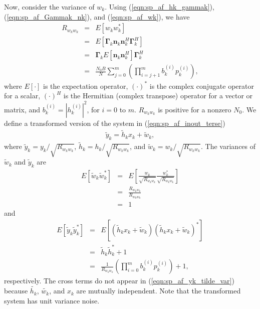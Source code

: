 Now, consider the variance of $w_k$.  Using (\ref{eqn:sp_af_hk_gammak}), (\ref{eqn:sp_af_Gammak_nk}), and (\ref{eqn:sp_af_wk}), we have
\begin{eqnarray}
R_{w_kw_k} & = & E \left[ w_k w_k^* \right] \\
& = & E \left[ \mathbf{\Gamma}_k \mathbf{n}_k \mathbf{n}_k^H \mathbf{\Gamma}_k^H \right] \\
& = & \mathbf{\Gamma}_k E \left[ \mathbf{n}_k \mathbf{n}_k^H  \right] \mathbf{\Gamma}_k^H \\
    & = & \frac{N_0B}{N} \sum_{j=0}^{m} \left( \prod_{i=j+1}^mb_k^{(i)}  p_k^{(i)}  \right) ,
\label{eqn:sp_af_Rwkwk}
\end{eqnarray}
where $E\left[ \cdot \right]$ is the expectation operator, $\left(\cdot\right)^*$ is the complex conjugate operator for a scalar, $\left( \cdot \right)^H$ is the Hermitian (complex transpose) operator for a vector or matrix, and $b_k^{(i)} = \left| h_k^{(i)} \right|^2$, for $i=0$ to $m$.  $R_{w_kw_k}$ is positive for a nonzero $N_0$.  We define a transformed version of the system in (\ref{eqn:sp_af_inout_terse})
\begin{eqnarray}
\tilde{y}_k = \tilde{h}_k x_k + \tilde{w}_k,
\end{eqnarray}
where $\tilde{y}_k = y_k / \sqrt{R_{w_kw_k}}$, $\tilde{h}_k = h_k / \sqrt{R_{w_kw_k}}$, and $\tilde{w}_k = w_k / \sqrt{R_{w_kw_k}}$.  The variances of $\tilde{w}_k$ and $\tilde{y}_k$ are
\begin{eqnarray}
E \left[ \tilde{w}_k \tilde{w}_k^* \right] & = & E \left[ \frac{w_k}{\sqrt{R_{w_kw_k}}} \frac{w_k^*}{\sqrt{R_{w_kw_k}}} \right] \\
& = & \frac{R_{w_kw_k}}{R_{w_kw_k}} \\
& = & 1
\end{eqnarray}
and
\begin{eqnarray}
E \left[ \tilde{y}_k \tilde{y}_k^* \right] & = & E \left[ \left( \tilde{h}_k x_k + \tilde{w}_k \right) \left( \tilde{h}_k x_k + \tilde{w}_k \right)^* \right] \\
& = & \tilde{h}_k \tilde{h}_k^* + 1 \\
& = & \frac{1}{R_{w_kw_k}} \left( \prod_{i=0}^m b_k^{(i)} p_k^{(i)} \right) + 1
\label{eqn:sp_af_yk_tilde_var} \mbox{,}
\end{eqnarray}
respectively.  The cross terms do not appear in (\ref{eqn:sp_af_yk_tilde_var}) because $\tilde{h_k}$, $\tilde{w_k}$, and $x_k$ are mutually independent.  Note that the transformed system has unit variance noise.

